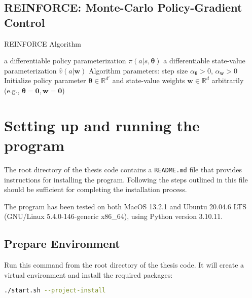 \documentclass[../xlapes02]{subfiles}
\begin{document}
    \section{REINFORCE: Monte-Carlo Policy-Gradient Control}
    \begin{algorithm}[h!]
        \caption{REINFORCE Algorithm}
        \label{alg:REINFORCE}

        a differentiable policy parameterization $\pi(a|s, \bm{\theta})$\;
        a differentiable state-value parameterization $\hat{v}(a|\bm{w})$\;
        Algorithm parameters: step size $\alpha_{\bm{\theta}} > 0$, $\alpha_{\bm{w}} > 0$\;
        Initialize policy parameter $\bm{\theta} \in \mathbb{R}^{d'}$ and state-value weights $\bm{w} \in \mathbb{R}^{d}$ arbitrarily (e.g., $\bm{\theta} = \bm{0}, \bm{w} = \bm{0}$)\;

    \end{algorithm}


    \chapter{Setting up and running the program}
    The root directory of the thesis code contains a \texttt{README.md} file that provides instructions for installing the program. Following the steps outlined in this file should be sufficient for completing the installation process.

    The program has been tested on both MacOS 13.2.1 and Ubuntu 20.04.6 LTS (GNU/Linux 5.4.0-146-generic x86\_64), using Python version 3.10.11.


    \section{Prepare Environment}
    Run this command from the root directory of the thesis code. It will create a virtual environment and install the required packages:
    \begin{lstlisting}[language=bash]
./start.sh --project-install
    \end{lstlisting}
\end{document}
